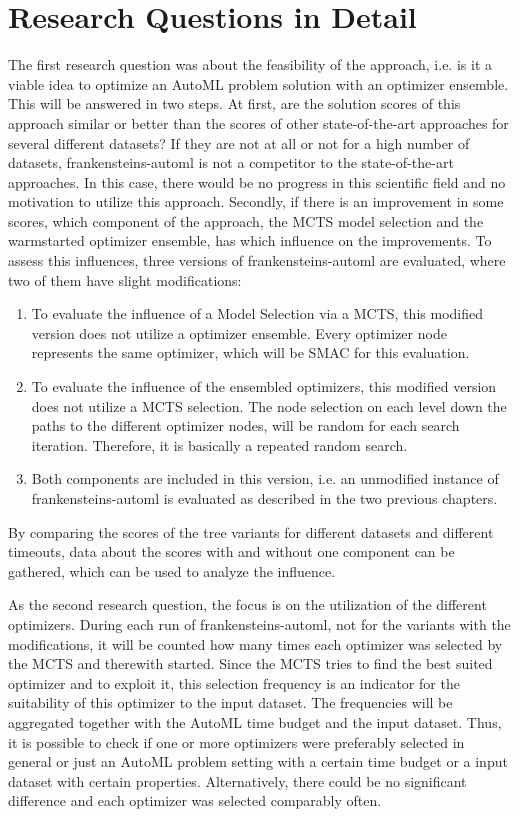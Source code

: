 \section{Research Questions in Detail}
The first research question was about the feasibility of the approach, i.e. is it a viable idea to optimize an AutoML problem solution with an optimizer ensemble.
This will be answered in two steps.\newline
At first, are the solution scores of this approach similar or better than the scores of other state-of-the-art approaches for several different datasets?
If they are not at all or not for a high number of datasets, frankensteins-automl is not a competitor to the state-of-the-art approaches.
In this case, there would be no progress in this scientific field and no motivation to utilize this approach.\newline
Secondly, if there is an improvement in some scores, which component of the approach, the MCTS model selection and the warmstarted optimizer ensemble, has which influence on the improvements.
To assess this influences, three versions of frankensteins-automl are evaluated, where two of them have slight modifications:
\begin{enumerate}
    \item To evaluate the influence of a Model Selection via a MCTS, this modified version does not utilize a optimizer ensemble.
    Every optimizer node represents the same optimizer, which will be SMAC for this evaluation.
    \item To evaluate the influence of the ensembled optimizers, this modified version does not utilize a MCTS selection.
    The node selection on each level down the paths to the different optimizer nodes, will be random for each search iteration.
    Therefore, it is basically a repeated random search.
    \item Both components are included in this version, i.e. an unmodified instance of frankensteins-automl is evaluated as described in the two previous chapters.
\end{enumerate}
By comparing the scores of the tree variants for different datasets and different timeouts, data about the scores with and without one component can be gathered, which can be used to analyze the influence.

As the second research question, the focus is on the utilization of the different optimizers.
During each run of frankensteins-automl, not for the variants with the modifications, it will be counted how many times each optimizer was selected by the MCTS and therewith started.
Since the MCTS tries to find the best suited optimizer and to exploit it, this selection frequency is an indicator for the suitability of this optimizer to the input dataset.\newline
The frequencies will be aggregated together with the AutoML time budget and the input dataset.
Thus, it is possible to check if one or more optimizers were preferably selected in general or just an AutoML problem setting with a certain time budget or a input dataset with certain properties.
Alternatively, there could be no significant difference and each optimizer was selected comparably often.

